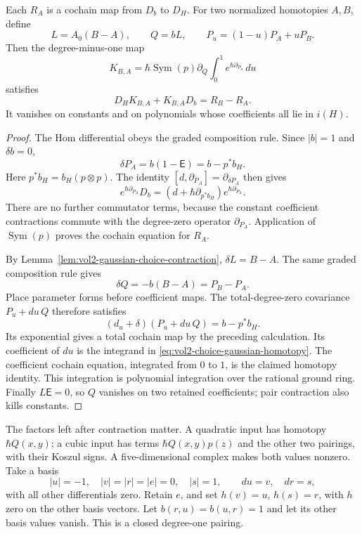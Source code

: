 \begin{proposition}\label{prop:vol2-choice-gaussian-homotopy}
Each $R_A$ is a cochain map from $D_b$ to $D_H$.
For two normalized homotopies $A,B$, define
\[
 L=A_0(B-A),\qquad Q=bL,\qquad
 P_u=(1-u)P_A+uP_B.
\]
Then the degree-minus-one map
\begin{equation}\label{eq:vol2-choice-gaussian-homotopy}
 K_{B,A}=\hbar\operatorname{Sym}(p)\partial_Q
                         \int_0^1e^{\hbar\partial_{P_u}}\,du
\end{equation}
satisfies
\[
 D_HK_{B,A}+K_{B,A}D_b=R_B-R_A.
\]
It vanishes on constants and on polynomials whose
coefficients all lie in $i(H)$.
\end{proposition}
\begin{proof}
The Hom differential obeys the graded composition rule.
Since $|b|=1$ and $\delta b=0$,
\[
 \delta P_A=b(1-\mathsf E)=b-p^*b_H.
\]
Here $p^*b_H=b_H(p\otimes p)$.
The identity $[d,\partial_{P_A}]=\partial_{\delta P_A}$
then gives
\[
 e^{\hbar\partial_{P_A}}D_b
       =(d+\hbar\partial_{p^*b_H})
                                      e^{\hbar\partial_{P_A}}.
\]
There are no further commutator terms, because the
constant coefficient contractions commute with the
degree-zero operator $\partial_{P_A}$.
Application of $\operatorname{Sym}(p)$ proves the
cochain equation for $R_A$.

By Lemma~\ref{lem:vol2-gaussian-choice-contraction},
$\delta L=B-A$. The same graded composition rule gives
\[
 \delta Q=-b(B-A)=P_B-P_A.
\]
Place parameter forms before coefficient maps. The
total-degree-zero covariance $P_u+du\,Q$ therefore
satisfies
\[
 (d_u+\delta)(P_u+du\,Q)=b-p^*b_H.
\]
Its exponential gives a total cochain map by the preceding
calculation. Its coefficient of $du$ is the integrand
in \eqref{eq:vol2-choice-gaussian-homotopy}. The
coefficient cochain equation, integrated from $0$ to $1$,
is the claimed homotopy identity. This integration is
polynomial integration over the rational ground ring.
Finally $L\mathsf E=0$, so $Q$ vanishes on two retained
coefficients; pair contraction also kills constants.
\end{proof}

The factors left after contraction matter. A quadratic
input has homotopy $\hbar Q(x,y)$; a cubic input has terms
$\hbar Q(x,y)p(z)$ and the other two pairings, with their
Koszul signs. A five-dimensional complex makes both
values nonzero. Take a basis
\[
 |u|=-1,\quad |v|=|r|=|e|=0,\quad |s|=1,
 \qquad du=v,\quad dr=s,
\]
with all other differentials zero. Retain $e$, and set
$h(v)=u$, $h(s)=r$, with $h$ zero on the other basis
vectors. Let $b(r,u)=b(u,r)=1$ and let its other basis
values vanish. This is a closed degree-one pairing.

